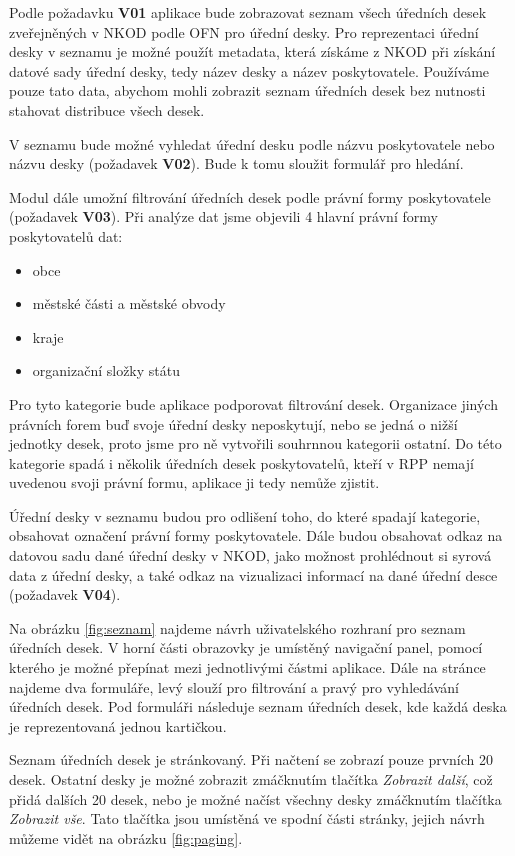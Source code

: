Podle požadavku \textbf{V01} aplikace bude zobrazovat seznam všech úředních desek zveřejněných v NKOD podle OFN pro úřední desky. Pro reprezentaci úřední desky v seznamu je možné použít metadata, která získáme z NKOD při získání datové sady úřední desky, tedy název desky a název poskytovatele. Používáme pouze tato data, abychom mohli zobrazit seznam úředních desek bez nutnosti stahovat distribuce všech desek.

V seznamu bude možné vyhledat úřední desku podle názvu poskytovatele nebo názvu desky (požadavek \textbf{V02}). Bude k tomu sloužit formulář pro hledání. 

Modul dále umožní filtrování úředních desek podle právní formy poskytovatele (požadavek \textbf{V03}). Při analýze dat jsme objevili 4 hlavní právní formy poskytovatelů dat:
\begin{itemize}
    \item obce
    \item městské části a městské obvody
    \item kraje
    \item organizační složky státu
\end{itemize}
Pro tyto kategorie bude aplikace podporovat filtrování desek. Organizace jiných právních forem buď svoje úřední desky neposkytují, nebo se jedná o nižší jednotky desek, proto jsme pro ně vytvořili souhrnnou kategorii ostatní. Do této kategorie spadá i několik úředních desek poskytovatelů, kteří v RPP nemají uvedenou svoji právní formu, aplikace ji tedy nemůže zjistit.

Úřední desky v seznamu budou pro odlišení toho, do které spadají kategorie, obsahovat označení právní formy poskytovatele. Dále budou obsahovat odkaz na datovou sadu dané úřední desky v NKOD, jako možnost prohlédnout si syrová data z úřední desky, a také odkaz na vizualizaci informací na dané úřední desce (požadavek \textbf{V04}).

Na obrázku \ref{fig:seznam} najdeme návrh uživatelského rozhraní pro seznam úředních desek. V horní části obrazovky je umístěný navigační panel, pomocí kterého je možné přepínat mezi jednotlivými částmi aplikace. Dále na stránce najdeme dva formuláře, levý slouží pro filtrování a pravý pro vyhledávání úředních desek. Pod formuláři následuje seznam úředních desek, kde každá deska je reprezentovaná jednou kartičkou.



Seznam úředních desek je stránkovaný. Při načtení se zobrazí pouze prvních 20 desek. Ostatní desky je možné zobrazit zmáčknutím tlačítka \textit{Zobrazit další}, což přidá dalších 20 desek, nebo je možné načíst všechny desky zmáčknutím tlačítka \textit{Zobrazit vše}. Tato tlačítka jsou umístěná ve spodní části stránky, jejich návrh můžeme vidět na obrázku \ref{fig:paging}.

